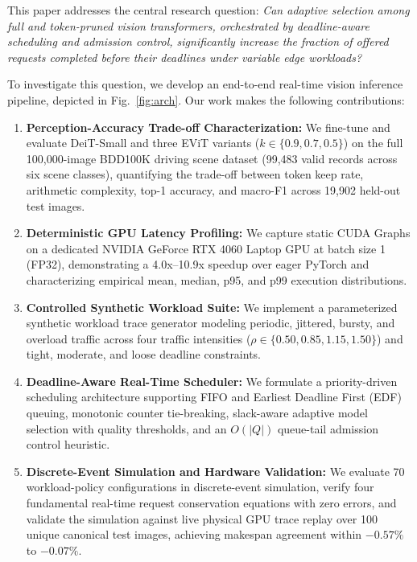 \documentclass[conference]{IEEEtran}
\begin{document}
This paper addresses the central research question: \textit{Can adaptive selection among full and token-pruned vision transformers, orchestrated by deadline-aware scheduling and admission control, significantly increase the fraction of offered requests completed before their deadlines under variable edge workloads?}

To investigate this question, we develop an end-to-end real-time vision inference pipeline, depicted in Fig.~\ref{fig:arch}. Our work makes the following contributions:
\begin{enumerate}
    \item \textbf{Perception-Accuracy Trade-off Characterization:} We fine-tune and evaluate DeiT-Small \cite{touvron2021training} and three EViT variants ($k \in \{0.9, 0.7, 0.5\}$) on the full 100,000-image BDD100K driving scene dataset \cite{yu2020bdd100k} (99,483 valid records across six scene classes), quantifying the trade-off between token keep rate, arithmetic complexity, top-1 accuracy, and macro-F1 across 19,902 held-out test images.
    \item \textbf{Deterministic GPU Latency Profiling:} We capture static CUDA Graphs \cite{nvidia2023cudagraphs} on a dedicated NVIDIA GeForce RTX 4060 Laptop GPU at batch size 1 (FP32), demonstrating a 4.0x--10.9x speedup over eager PyTorch and characterizing empirical mean, median, p95, and p99 execution distributions.
    \item \textbf{Controlled Synthetic Workload Suite:} We implement a parameterized synthetic workload trace generator modeling periodic, jittered, bursty, and overload traffic across four traffic intensities ($\rho \in \{0.50, 0.85, 1.15, 1.50\}$) and tight, moderate, and loose deadline constraints.
    \item \textbf{Deadline-Aware Real-Time Scheduler:} We formulate a priority-driven scheduling architecture supporting FIFO and Earliest Deadline First (EDF) queuing, monotonic counter tie-breaking, slack-aware adaptive model selection with quality thresholds, and an $O(|Q|)$ queue-tail admission control heuristic.
    \item \textbf{Discrete-Event Simulation and Hardware Validation:} We evaluate 70 workload-policy configurations in discrete-event simulation, verify four fundamental real-time request conservation equations with zero errors, and validate the simulation against live physical GPU trace replay over 100 unique canonical test images, achieving makespan agreement within $-0.57\%$ to $-0.07\%$.
\end{enumerate}
\end{document}
